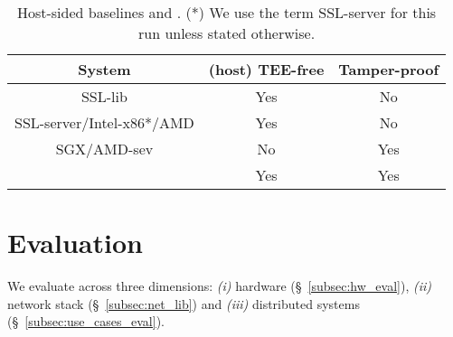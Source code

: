 


\begin{table}
\begin{center}
\footnotesize
\begin{tabular}{ |c|c|c| } 
 \hline
 System &  (host) TEE-free & Tamper-proof \\ [0.5ex] \hline \hline
 SSL-lib & Yes & No\\
 SSL-server/Intel-x86*/AMD  &  Yes & No\\
 SGX/AMD-sev &  No & Yes\\
 \projecttitle{} & Yes & Yes\\
 \hline
\end{tabular}
\end{center}
\caption{Host-sided baselines and \projecttitle{}. (*) We use the term SSL-server for this run unless stated otherwise.}
\label{tab:hw_options}
\vspace{-8pt}
\end{table}

\section{Evaluation}
\label{sec:eval}

We evaluate \projecttitle{} across three dimensions: {\em (i)} 
hardware (\S~\ref{subsec:hw_eval}), {\em (ii)} network stack (\S~\ref{subsec:net_lib}) and {\em (iii)} distributed systems (\S~\ref{subsec:use_cases_eval}).



